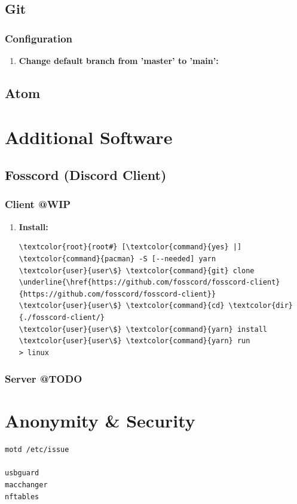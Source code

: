 \documentclass[10pt, a4paper, onecolumn, oneside, titlepage, openany]{book}
\begin{document}
\section{Git}
\subsection{Configuration}
\begin{enumerate}
    \item \textbf{Change default branch from 'master' to 'main':}
\end{enumerate}

\section{Atom}

\chapter{Additional Software}
\section{Fosscord (Discord Client)}
\subsection{Client @WIP}
\begin{enumerate}
    \item \textbf{Install:}
\begin{Verbatim}[commandchars=\\\{\}]
\textcolor{root}{root#} [\textcolor{command}{yes} |] \textcolor{command}{pacman} -S [--needed] yarn
\textcolor{user}{user\$} \textcolor{command}{git} clone \underline{\href{https://github.com/fosscord/fosscord-client}{https://github.com/fosscord/fosscord-client}}
\textcolor{user}{user\$} \textcolor{command}{cd} \textcolor{dir}{./fosscord-client/}
\textcolor{user}{user\$} \textcolor{command}{yarn} install
\textcolor{user}{user\$} \textcolor{command}{yarn} run
> linux
\end{Verbatim}        
\end{enumerate}
\subsection{Server @TODO}


\chapter{Anonymity \& Security}
\begin{Verbatim}[commandchars=\\\{\}]
motd /etc/issue

usbguard
macchanger
nftables

\end{Verbatim}
\end{document}
